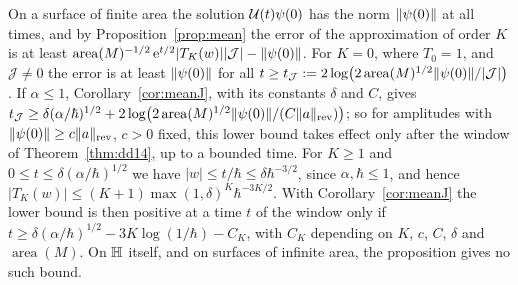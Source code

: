 \begin{remark}\label{rem:mean}
On a surface of finite area the solution $\mathcal{U}(t)\psi(0)$ has the norm $\lVert \psi(0)\rVert$ at all times, and by
Proposition~\ref{prop:mean} the error of the approximation of order $K$ is at least
$\operatorname{area}(M)^{-1/2}\,\mathrm{e}^{t/2}|T_K(w)||\mathcal J|-\lVert \psi(0)\rVert$. For $K=0$, where $T_0=1$, and $\mathcal J\ne0$ the error is at least
$\lVert \psi(0)\rVert$ for all $t\ge t_{\mathcal J}:=2\log\bigl(2\operatorname{area}(M)^{1/2}\lVert \psi(0)\rVert/|\mathcal J|\bigr)$. If
$\alpha\le1$, Corollary~\ref{cor:meanJ}, with its constants $\delta$ and $C$, gives $t_{\mathcal J}\ge\delta(\alpha/\hbar)^{1/2}+2\log\bigl(2\operatorname{area}(M)^{1/2}\lVert \psi(0)\rVert/(C\lVert a\rVert_{\mathrm{rev}})\bigr)$; so
for amplitudes with $\lVert \psi(0)\rVert\ge c\lVert a\rVert_{\mathrm{rev}}$, $c>0$ fixed, this lower bound takes effect only after the window of
Theorem~\ref{thm:dd14}, up to a bounded time. For $K\ge1$ and $0\le t\le\delta(\alpha/\hbar)^{1/2}$ we have
$|w|\le t/\hbar\le\delta\hbar^{-3/2}$, since $\alpha,\hbar\le1$, and hence $|T_K(w)|\le(K+1)\max(1,\delta)^K\hbar^{-3K/2}$. With
Corollary~\ref{cor:meanJ} the lower bound is then positive at a time $t$ of the window only if
$t\ge\delta(\alpha/\hbar)^{1/2}-3K\log(1/\hbar)-C_K$, with $C_K$ depending on $K$, $c$, $C$, $\delta$ and $\operatorname{area}(M)$. On $\mathbb{H}$
itself, and on surfaces of infinite area, the proposition gives no such bound.
\end{remark}
